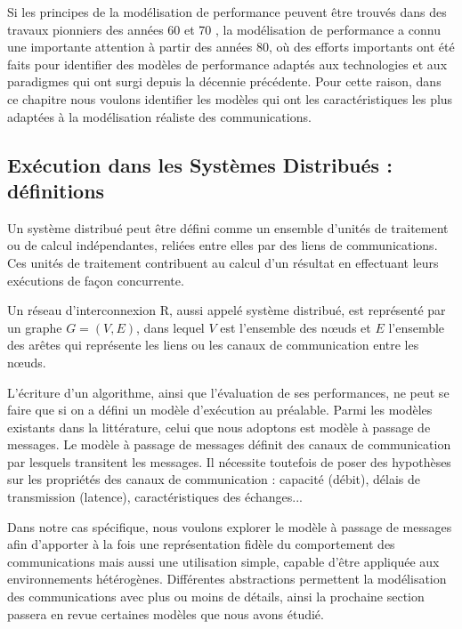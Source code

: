 Si les principes de la modélisation de performance peuvent être trouvés
dans des travaux pionniers des années 60 et 70 \cite{Peterson81},
la modélisation de performance a connu une importante attention à
partir des années 80, où des efforts importants ont été faits pour
identifier des modèles de performance adaptés aux technologies et aux
paradigmes qui ont surgi depuis la décennie précédente. Pour cette
raison, dans ce chapitre nous voulons identifier les modèles qui ont les caractéristiques
les plus adaptées à la modélisation réaliste des communications.


\subsection{Exécution dans les Systèmes Distribués : définitions}

Un système distribué peut être défini comme un ensemble
d'unités de traitement ou de calcul indépendantes, reliées entre elles
par des liens de communications. Ces unités de traitement contribuent
au calcul d'un résultat en effectuant leurs exécutions de façon
concurrente.

Un réseau d'interconnexion {\cal R}, aussi appelé système distribué,
est représenté par un graphe $G =(V,E)$, dans lequel $V$ est
l'ensemble des n{\oe}uds et $E$ l'ensemble des arêtes qui représente  les
liens ou les canaux de communication entre les n{\oe}uds.


L'écriture d'un algorithme, ainsi que l'évaluation de ses
performances, ne peut se faire que si on a défini un
modèle d'exécution au préalable. Parmi les modèles existants dans la littérature,  celui que nous adoptons est modèle à passage de messages. Le modèle à passage de messages définit des canaux de communication
par lesquels transitent les messages. Il nécessite toutefois de poser des
hypothèses sur les propriétés des canaux de communication : capacité (débit),
délais de transmission (latence), caractéristiques des échanges...

Dans notre cas spécifique, nous voulons explorer le modèle à passage de messages afin d'apporter à la fois une
représentation fidèle du comportement des communications mais aussi une 
utilisation simple, capable d'être appliquée aux environnements hétérogènes. Différentes abstractions permettent la modélisation des communications avec plus ou moins de détails, ainsi la prochaine section passera en revue certaines modèles que nous avons étudié.



